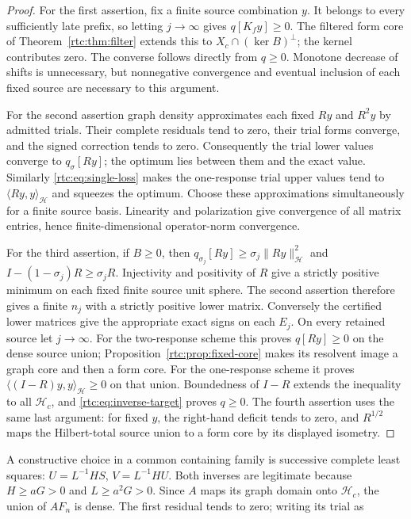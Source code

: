 \documentclass[11pt,a4paper]{article}
\numberwithin{equation}{section}
\theoremstyle{definition}\newtheorem{definition}[theorem]{Definition}
\theoremstyle{remark}\newtheorem{remark}[theorem]{Remark}
\newcommand{\Hh}{\mathcal H}\newcommand{\Hw}{\mathcal H}
\newcommand{\ip}[2]{\langle#1,#2\rangle}\newcommand{\norm}[1]{\lVert#1\rVert}\newcommand{\abs}[1]{\lvert#1\rvert}
\begin{document}
\begin{proof}
For the first assertion, fix a finite source combination $y$.
It belongs to every sufficiently late prefix, so letting $j\to\infty$
gives $q[K_fy]\ge0$. The filtered form core of
Theorem~\ref{rtc:thm:filter} extends this to $X_c\cap(\ker B)^\perp$;
the kernel contributes zero. The converse follows directly from $q\ge0$.
Monotone decrease of shifts is unnecessary, but nonnegative convergence
and eventual inclusion of each fixed source are necessary to this argument.

For the second assertion graph density approximates each fixed $Ry$ and
$R^2y$ by admitted trials. Their complete residuals tend to zero, their
trial forms converge, and the signed correction tends to zero. Consequently
the trial lower values converge to $q_\sigma[Ry]$; the optimum lies between
them and the exact value. Similarly \eqref{rtc:eq:single-loss} makes the
one-response trial upper values tend to $\ip{Ry}y_{\Hh}$ and squeezes
the optimum. Choose these approximations simultaneously for a finite source
basis. Linearity and polarization give convergence of all matrix entries,
hence finite-dimensional operator-norm convergence.

For the third assertion, if $B\ge0$, then
$q_{\sigma_j}[Ry]\ge\sigma_j\norm{Ry}_{\Hh}^2$ and
$I-(1-\sigma_j)R\ge\sigma_jR$.
Injectivity and positivity of $R$ give a strictly positive minimum on each
fixed finite source unit sphere. The second assertion therefore gives a
finite $n_j$ with a strictly positive lower matrix.
Conversely the certified lower matrices give the appropriate exact signs
on each $E_j$. On every retained source let $j\to\infty$.
For the two-response scheme this proves $q[Ry]\ge0$ on the dense source
union; Proposition~\ref{rtc:prop:fixed-core} makes its resolvent image a
graph core and then a form core. For the one-response scheme it proves
$\ip{(I-R)y}y_{\Hh}\ge0$ on that union. Boundedness of $I-R$ extends the
inequality to all $\Hh_c$, and \eqref{rtc:eq:inverse-target} proves $q\ge0$.
The fourth assertion uses the same last argument: for fixed $y$, the
right-hand deficit tends to zero, and $R^{1/2}$ maps the Hilbert-total
source union to a form core by its displayed isometry.
\end{proof}
A constructive choice in a common containing family is successive complete
least squares:
$U=L^{-1}HS$, $V=L^{-1}HU$. Both inverses are legitimate because
$H\ge aG>0$ and $L\ge a^2G>0$.
Since $A$ maps its graph domain onto $\Hh_c$, the union of $AF_n$ is
dense. The first residual tends to zero; writing its trial as
\end{document}
